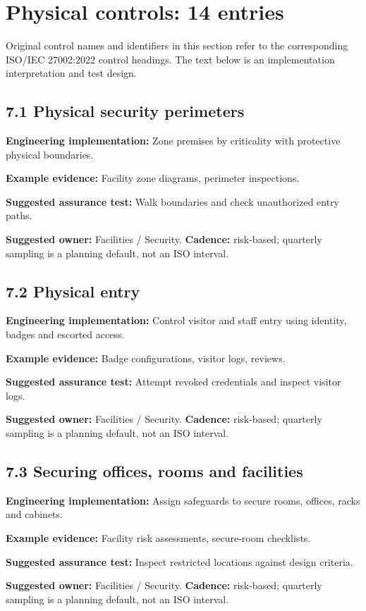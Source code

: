 \documentclass[11pt,letterpaper]{article}
\begin{document}
\section{Physical controls: 14 entries}
\SourceTag Original control names and identifiers in this section refer to the corresponding ISO/IEC 27002:2022 control headings. The text below is an implementation interpretation and test design.\par
\subsection{7.1 Physical security perimeters}
\textbf{Engineering implementation:} Zone premises by criticality with protective physical boundaries.\par
\textbf{Example evidence:} Facility zone diagrams, perimeter inspections.\par
\textbf{Suggested assurance test:} Walk boundaries and check unauthorized entry paths.\par
\textbf{Suggested owner:} Facilities / Security. \textbf{Cadence:} risk-based; quarterly sampling is a planning default, not an ISO interval.\par
{}
\subsection{7.2 Physical entry}
\textbf{Engineering implementation:} Control visitor and staff entry using identity, badges and escorted access.\par
\textbf{Example evidence:} Badge configurations, visitor logs, reviews.\par
\textbf{Suggested assurance test:} Attempt revoked credentials and inspect visitor logs.\par
\textbf{Suggested owner:} Facilities / Security. \textbf{Cadence:} risk-based; quarterly sampling is a planning default, not an ISO interval.\par
{}
\subsection{7.3 Securing offices, rooms and facilities}
\textbf{Engineering implementation:} Assign safeguards to secure rooms, offices, racks and cabinets.\par
\textbf{Example evidence:} Facility risk assessments, secure-room checklists.\par
\textbf{Suggested assurance test:} Inspect restricted locations against design criteria.\par
\textbf{Suggested owner:} Facilities / Security. \textbf{Cadence:} risk-based; quarterly sampling is a planning default, not an ISO interval.\par
{}
\end{document}
